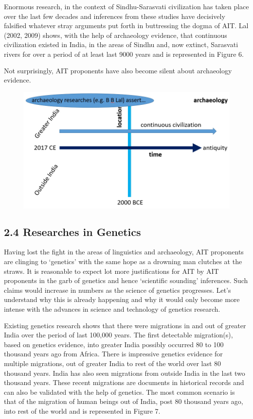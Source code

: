 Enormous research, in the context of Sindhu-Sarasvati civilization has taken place over the last few decades and inferences from these studies have decisively falsified whatever stray arguments put forth in buttressing the dogma of AIT. Lal (2002, 2009) shows, with the help of archaeology evidence, that continuous civilization existed in India, in the areas of Sindhu and, now extinct, Sarasvati rivers for over a period of at least last 9000 years and is represented in Figure 6.

Not surprisingly, AIT proponents have also become silent about archaeology evidence.

\begin{figure}[!htbp]
\includegraphics[scale=0.22]{images/8-06.jpg}
\caption{}\label{art8-fig06}
\end{figure}


\subsection*{2.4 Researches in Genetics}

Having lost the fight in the areas of linguistics and archaeology, AIT proponents are clinging to ‘genetics’ with the same hope as a drowning man clutches at the straws. It is reasonable to expect lot more justifications for AIT by AIT proponents in the garb of genetics and hence ‘scientific sounding’ inferences. Such claims would increase in numbers as the science of genetics progresses. Let’s understand why this is already happening and why it would only become more intense with the advances in science and technology of genetics research.

Existing genetics research shows that there were migrations in and out of greater India over the period of last 100,000 years. The first detectable migration(s), based on genetics evidence, into greater India possibly occurred 80 to 100 thousand years ago from Africa. There is impressive genetics evidence for multiple migrations, out of greater India to rest of the world over last 80 thousand years. India has also seen migrations from outside India in the last two thousand years. These recent migrations are documents in historical records and can also be validated with the help of genetics. The most common scenario is that of the migration of human beings out of India, post 80 thousand years ago, into rest of the world and is represented in Figure 7.

